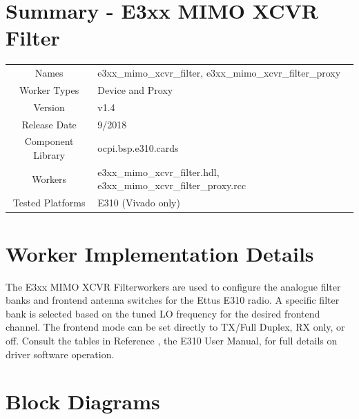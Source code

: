 \documentclass{article}
\author{} %
\date{Version \docVersion} %
\title{\docTitle}
\def\docVersion{1.4}
\def\comp{e3xx\_mimo\_xcvr\_filter}
\def\proxy{e3xx\_mimo\_xcvr\_filter\_proxy}
\def\Comp{E3xx MIMO XCVR Filter and Proxy }
\def\comp{e3xx\_mimo\_xcvr\_filter}
\def\Comp{E3xx MIMO XCVR Filter}
\begin{document}
\section*{Summary - \Comp}
\begin{tabular}{|c|M{13.5cm}|}
	\hline
	                  &                                      \\
	\hline
	Names              & \comp, \proxy                        \\
	\hline
	Worker Types       & Device and Proxy \\
	\hline
	Version           & v\docVersion \\
	\hline
	Release Date      & 9/2018 \\
	\hline
	Component Library & ocpi.bsp.e310.cards   \\
	\hline
	Workers           & \comp.hdl, \proxy.rcc                \\
	\hline
	Tested Platforms  & E310 (Vivado only)                       \\
	\hline
\end{tabular}

\section*{Worker Implementation Details}
The \Comp workers are used to configure the analogue filter banks and frontend antenna switches for the Ettus E310 radio. A specific filter bank is selected based on the tuned LO frequency for the desired frontend channel. The frontend mode can be set directly to TX/Full Duplex, RX only, or off. Consult the tables in Reference \cite{usermanual}, the E310 User Manual, for full details on driver software operation.
\section*{Block Diagrams}
\end{document}
